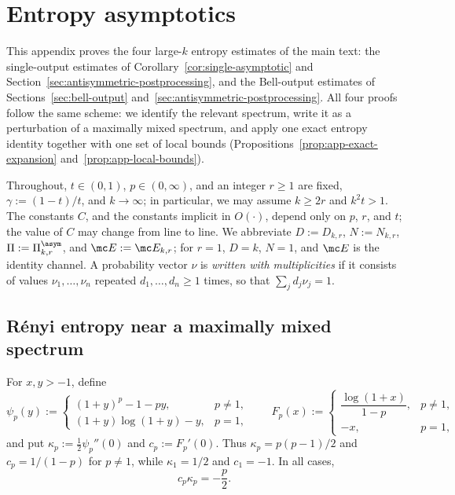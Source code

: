 
\section{Entropy asymptotics}\label{app:entropy-asymptotics}
 This appendix proves the four large-\(k\) entropy estimates of the main
text: the single-output estimates of Corollary~\ref{cor:single-asymptotic}
and Section~\ref{sec:antisymmetric-postprocessing}, and the Bell-output
estimates of Sections~\ref{sec:bell-output}
and~\ref{sec:antisymmetric-postprocessing}.  All four proofs follow the
same scheme: we identify the relevant spectrum, write it as a
perturbation of a maximally mixed spectrum, and apply one exact entropy
identity together with one set of local bounds
(Propositions~\ref{prop:app-exact-expansion}
and~\ref{prop:app-local-bounds}).
 
Throughout, \(t\in(0,1)\), \(p\in(0,\infty)\), and an integer \(r\geq1\)
are fixed, \(\gamma:=(1-t)/t\), and \(k\to\infty\); in particular, we may
assume \(k\ge2r\) and \(k^2t>1\).  The constants \(C\), and the constants
implicit in \(O(\cdot)\), depend only on \(p\), \(r\), and \(t\); the value
of \(C\) may change from line to line.  We abbreviate \(D:=D_{k,r}\),
\(N:=N_{k,r}\), \(\Pi:=\Pi_{k,r}^{\asym}\), and \(\mc E:=\mc E_{k,r}\); for
\(r=1\), \(D=k\), \(N=1\), and \(\mc E\) is the identity channel.  A
probability vector \(\nu\) is \emph{written with multiplicities} if it
consists of values \(\nu_1,\ldots,\nu_n\) repeated
\(d_1,\ldots,d_n\geq1\) times, so that \(\sum_jd_j\nu_j=1\).
 
\subsection{R\'enyi entropy near a maximally mixed spectrum}
 
For \(x,y>-1\), define
\begin{equation}
    \psi_p(y):=
    \begin{cases}
        (1+y)^p-1-py, & p\neq1,\\
        (1+y)\log(1+y)-y, & p=1,
    \end{cases}
    \qquad
    F_p(x):=
    \begin{cases}
        \dfrac{\log(1+x)}{1-p}, & p\neq1,\\[6pt]
        -x, & p=1,
    \end{cases}
    \label{eq:app-psi-F}
\end{equation}
and put \(\kappa_p:=\frac12\psi_p''(0)\) and \(c_p:=F_p'(0)\).  Thus
\(\kappa_p=p(p-1)/2\) and \(c_p=1/(1-p)\) for \(p\neq1\), while
\(\kappa_1=1/2\) and \(c_1=-1\).  In all cases,
\begin{equation}
    c_p\kappa_p=-\frac p2.
    \label{eq:app-cp-kappa}
\end{equation}
 
